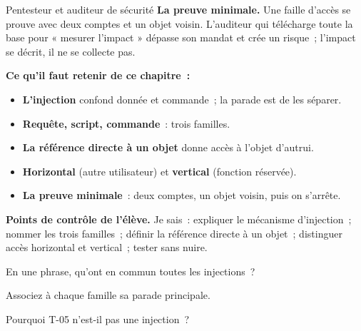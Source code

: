 \begin{boxmetier}{Pentesteur et auditeur de sécurité}
\textbf{La preuve minimale.} Une faille d'accès se prouve avec deux comptes
et un objet voisin. L'auditeur qui télécharge toute la base pour « mesurer
l'impact » dépasse son mandat et crée un risque~; l'impact se décrit, il ne
se collecte pas.
\end{boxmetier}

\separateur

\begin{boxresume}
\textbf{Ce qu'il faut retenir de ce chapitre~:}
\begin{itemize}
    \item \textbf{L'injection} confond donnée et commande~; la parade est de
          les séparer.
    \item \textbf{Requête, script, commande}~: trois familles.
    \item \textbf{La référence directe à un objet} donne accès à l'objet
          d'autrui.
    \item \textbf{Horizontal} (autre utilisateur) et \textbf{vertical}
          (fonction réservée).
    \item \textbf{La preuve minimale}~: deux comptes, un objet voisin, puis
          on s'arrête.
\end{itemize}
\end{boxresume}

\begin{boxinfo}
\textbf{Points de contrôle de l'élève.} Je sais~: expliquer le mécanisme
d'injection~; nommer les trois familles~; définir la référence directe à un
objet~; distinguer accès horizontal et vertical~; tester sans nuire.
\end{boxinfo}

\bigskip

\begin{boxexo}[title={\ding{45}\quad Exercice~15.1. Mécanisme \niveaubase}]
En une phrase, qu'ont en commun toutes les injections~?
\end{boxexo}

\begin{boxexo}[title={\ding{45}\quad Exercice~15.2. Familles \niveaubase}]
Associez à chaque famille sa parade principale.
\end{boxexo}

\begin{boxexo}[title={\ding{45}\quad Exercice~15.3. T-05 \niveaubase}]
Pourquoi T-05 n'est-il pas une injection~?
\end{boxexo}

